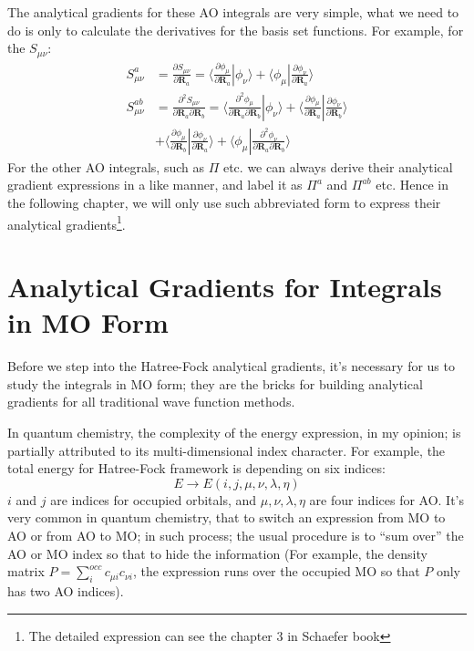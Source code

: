 The analytical gradients for these AO integrals are very simple, what we need
to do is only to calculate the derivatives for the basis set functions. For
example, for the $S_{\mu\nu}$:
\begin{align}
 \label{AO_INT_gradient_eq:1}
S_{\mu\nu}^{a} &= \frac{\partial S_{\mu\nu}}{\partial \bm{R}_{a}} =
\langle\frac{\partial\phi_{\mu}}{\partial \bm{R}_{a}}|\phi_{\nu}\rangle + 
\langle\phi_{\mu}|\frac{\partial\phi_{\nu}}{\partial \bm{R}_{a}}\rangle
\nonumber \\
S_{\mu\nu}^{ab} &= \frac{\partial^{2} S_{\mu\nu}}{\partial \bm{R}_{a}\partial
\bm{R}_{b}} = \langle\frac{\partial^{2}\phi_{\mu}}{\partial
\bm{R}_{a}\partial\bm{R}_{b}}|\phi_{\nu}\rangle + \langle\frac{
\partial\phi_{\mu}}{\partial\bm{R}_{a}}|\frac{\partial\phi_{\nu}}{\partial\bm{R}
_{b}}\rangle \nonumber \\
&+
\langle\frac{\partial\phi_{\mu}}{\partial\bm{R}_{b}}|\frac{\partial\phi_{\nu}}{
\partial\bm{R}
_{a}}\rangle + \langle\phi_{\mu}|\frac{\partial^{2}\phi_{\nu}}{\partial
\bm{R}_{a}\partial\bm{R}_{b}}\rangle 
\end{align}
For the other AO integrals, such as $\Pi$ etc. we can always derive their
analytical gradient expressions in a like manner, and label it as $\Pi^{a}$
and $\Pi^{ab}$ etc. Hence in the following chapter, we will only use such
abbreviated form to express their analytical gradients\footnote{The detailed
expression can see the chapter 3 in Schaefer
book\cite{New_Dimension_for_Derivatives_Calculation}}.



\section{Analytical Gradients for Integrals in MO Form}
%
%
%
%
Before we step into the Hatree-Fock analytical gradients, it's necessary for us
to study the integrals in MO form; they are the bricks for building
analytical gradients for all traditional wave function methods.

In quantum chemistry, the complexity of the energy expression, in my opinion;
is partially attributed to its multi-dimensional index character. For example,
the total energy for Hatree-Fock framework is depending on six indices:
\begin{equation}
 \label{MO_INT_gradient_general_eq:1}
E \rightarrow E(i,j,\mu,\nu,\lambda,\eta)
\end{equation}
$i$ and $j$ are indices for occupied orbitals, and $\mu,\nu,\lambda,\eta$ are
four indices for AO. It's very common in quantum chemistry, that to switch an
expression from MO to AO or from AO to MO; in such process; the usual procedure
is to ``sum over'' the AO or MO index so that to hide the information (For
example, the density matrix $P = \sum_{i}^{occ}c_{\mu i}c_{\nu i}$, the
expression runs over the occupied MO so that $P$ only has two AO indices).

